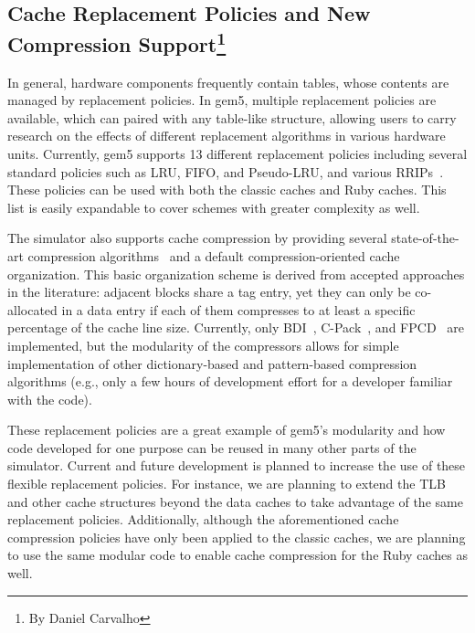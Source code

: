 \subsection[Cache Replacement Policies and New Compression Support]{Cache Replacement Policies and New Compression Support\footnote{By Daniel Carvalho}}

In general, hardware components frequently contain tables, whose contents are managed by replacement policies.
In gem5, multiple replacement policies are available, which can paired with any table-like structure, allowing users to carry research on the effects of different replacement algorithms in various hardware units.
Currently, gem5 supports 13 different replacement policies including several standard policies such as LRU, FIFO, and Pseudo-LRU, and various RRIPs~\cite{Jaleel2010rrip}.
These policies can be used with both the classic caches and Ruby caches.
This list is easily expandable to cover schemes with greater complexity as well.

The simulator also supports cache compression by providing several state-of-the-art compression algorithms~\cite{sardashti2015primer} and a default compression-oriented cache organization.
This basic organization scheme is derived from accepted approaches in the literature: adjacent blocks share a tag entry, yet they can only be co-allocated in a data entry if each of them compresses to at least a specific percentage of the cache line size.
Currently, only BDI~\cite{pekhimenko2012base}, C-Pack~\cite{chen2010c}, and FPCD~\cite{alameldeen2018opportunistic} are implemented, but the modularity of the compressors allows for simple implementation of other dictionary-based and pattern-based compression algorithms (e.g., only a few hours of development effort for a developer familiar with the code).

These replacement policies are a great example of gem5's modularity and how code developed for one purpose can be reused in many other parts of the simulator.
Current and future development is planned to increase the use of these flexible replacement policies.
For instance, we are planning to extend the TLB and other cache structures beyond the data caches to take advantage of the same replacement policies.
Additionally, although the aforementioned cache compression policies have only been applied to the classic caches, we are planning to use the same modular code to enable cache compression for the Ruby caches as well.
